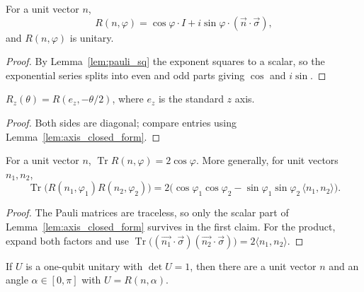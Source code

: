 \begin{lemma}
  \label{lem:axis_closed_form}
  \leanok
  For a unit vector $n$,
  \[
    R(n,\varphi) = \cos\varphi \cdot I + i\sin\varphi \cdot
      (\vec{n}\cdot\vec{\sigma}),
  \]
  and $R(n,\varphi)$ is unitary.
\end{lemma}

\begin{proof}
  \leanok
  By Lemma~\ref{lem:pauli_sq} the exponent squares to a scalar, so the
  exponential series splits into even and odd parts giving $\cos$ and
  $i\sin$.
\end{proof}

\begin{lemma}
  \label{lem:rz_axis}
  \leanok
  $R_z(\theta) = R(e_z, -\theta/2)$, where $e_z$ is the standard $z$ axis.
\end{lemma}

\begin{proof}
  \leanok
  Both sides are diagonal; compare entries using
  Lemma~\ref{lem:axis_closed_form}.
\end{proof}

\begin{lemma}
  \label{lem:trace_axis}
  \leanok
  For a unit vector $n$, $\operatorname{Tr} R(n,\varphi) = 2\cos\varphi$.  More
  generally, for unit vectors $n_1, n_2$,
  \[
    \operatorname{Tr}\big(R(n_1,\varphi_1)R(n_2,\varphi_2)\big)
      = 2\big(\cos\varphi_1\cos\varphi_2
        - \sin\varphi_1\sin\varphi_2\,\langle n_1, n_2\rangle\big).
  \]
\end{lemma}

\begin{proof}
  \leanok
  The Pauli matrices are traceless, so only the scalar part of
  Lemma~\ref{lem:axis_closed_form} survives in the first claim.  For the
  product, expand both factors and use
  $\operatorname{Tr}\big((\vec{n_1}\cdot\vec\sigma)(\vec{n_2}\cdot\vec\sigma)\big)
   = 2\langle n_1,n_2\rangle$.
\end{proof}

\begin{lemma}
  \label{lem:su2_axis}
  \leanok
  If $U$ is a one-qubit unitary with $\det U = 1$, then there are a unit vector
  $n$ and an angle $\alpha \in [0,\pi]$ with $U = R(n,\alpha)$.
\end{lemma}

